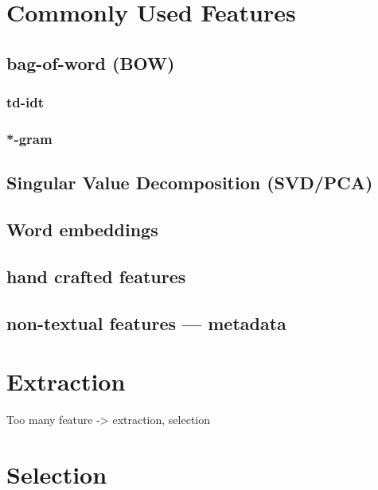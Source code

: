 \section{Commonly Used Features}

\subsection{bag-of-word (BOW)}

\subsubsection{td-idt}


\subsubsection{*-gram}




\subsection{Singular Value Decomposition (SVD/PCA)}

\subsection{Word embeddings}

\subsection{hand crafted features}

\subsection{non-textual features --- metadata}



\section{Extraction}

Too many feature -> extraction, selection



\section{Selection}

